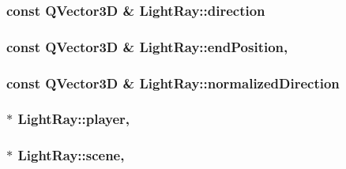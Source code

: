 \subsubsection[{direction}]{\setlength{\rightskip}{0pt plus 5cm}const Q\+Vector3\+D \& Light\+Ray\+::direction\hspace{0.3cm}{\ttfamily [read]}}\label{class_light_ray_a001a750a7d287ce54dd1772aa18be6c7}
\hypertarget{class_light_ray_a79917df93dd2cc9c8915fe659b3dd0da}{}
\subsubsection[{end\+Position}]{\setlength{\rightskip}{0pt plus 5cm}const Q\+Vector3\+D \& Light\+Ray\+::end\+Position\hspace{0.3cm}{\ttfamily [read]}, {\ttfamily [write]}}\label{class_light_ray_a79917df93dd2cc9c8915fe659b3dd0da}
\hypertarget{class_light_ray_ae6599fa543d56b2c812afa16f5ac4bbc}{}
\subsubsection[{normalized\+Direction}]{\setlength{\rightskip}{0pt plus 5cm}const Q\+Vector3\+D \& Light\+Ray\+::normalized\+Direction\hspace{0.3cm}{\ttfamily [read]}}\label{class_light_ray_ae6599fa543d56b2c812afa16f5ac4bbc}
\hypertarget{class_light_ray_ac86091ec591fbf919bcc6c97beee47ec}{}
\subsubsection[{player}]{ $\ast$ Light\+Ray\+::player\hspace{0.3cm}{\ttfamily [read]}, {\ttfamily [write]}}\label{class_light_ray_ac86091ec591fbf919bcc6c97beee47ec}
\hypertarget{class_light_ray_afd3d673f6ca3570f648bb706d7f2d6e6}{}
\subsubsection[{scene}]{ $\ast$ Light\+Ray\+::scene\hspace{0.3cm}{\ttfamily [read]}, {\ttfamily [write]}}\label{class_light_ray_afd3d673f6ca3570f648bb706d7f2d6e6}
\hypertarget{class_light_ray_af91b7c6c3c299e2a39b8c7f016f9ce15}{}
